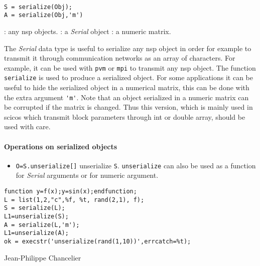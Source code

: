 
\begin{mandesc}
   \\
\end{mandesc}
\begin{calling_sequence}
\begin{verbatim}
S = serialize(Obj);
A = serialize(Obj,'m')
\end{verbatim}
\end{calling_sequence}
\begin{parameters}
  \begin{varlist}
    :  any nsp objects. 
    : a \emph{Serial} object 
    : a numeric matrix.
  \end{varlist}
\end{parameters}

\begin{mandescription}
The \emph{Serial} data type is useful to serialize any nsp object in order 
for example to transmit it through communication networks as an array of 
characters. For example, it can be used with \verb+pvm+ or \verb+mpi+ to transmit any 
nsp object. The function \verb+serialize+ is used to produce a serialized object. 
For some applications it can be useful to hide the serialized object in a 
numerical matrix, this can be done with the extra argument \verb+'m'+. Note 
that an object serialized in a numeric matrix can be corrupted if 
the matrix is changed. Thus this version, which is mainly used in scicos 
which transmit block parameters through int or double array, should 
be used with care. 
\end{mandescription}

\paragraph{Operations on serialized objects}
\begin{itemize}
   \item \verb+O=S.unserialize[]+ unserialize \verb+S+. \verb+unserialize+ can 
     also be used as a function for \emph{Serial} arguments or for numeric 
     argument.
\end{itemize}

\begin{examples}
\begin{Verbatim}
function y=f(x);y=sin(x);endfunction;
L = list(1,2,"c",%f, %t, rand(2,1), f);
S = serialize(L);
L1=unserialize(S);
A = serialize(L,'m');
L1=unserialize(A);
ok = execstr('unserialize(rand(1,10))',errcatch=%t);
\end{Verbatim}
 \end{examples}

\begin{manseealso}

\end{manseealso}

\begin{authors}
   Jean-Philippe Chancelier
\end{authors}

